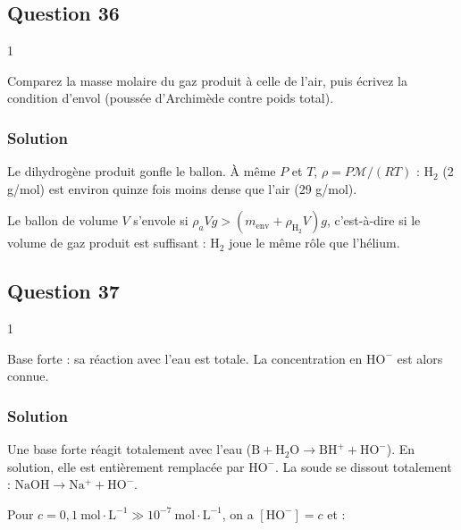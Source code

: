 \documentclass[11pt,a4paper]{article}
\begin{document}
\hypertarget{question-36}{%
\subsection{Question 36}\label{question-36}}

\begin{indication}{1}

Comparez la masse molaire du gaz produit à celle de l'air, puis écrivez la condition d'envol (poussée d'Archimède contre poids total).

\end{indication}

\hypertarget{solution-35}{%
\subsubsection{Solution}\label{solution-35}}

Le dihydrogène produit gonfle le ballon. À même \(P\) et \(T\), \(\rho=P\mathcal M/(RT)\) : \(\mathrm H_2\) (2 g/mol) est environ quinze fois moins dense que l'air (29 g/mol).

Le ballon de volume \(V\) s'envole si \(\rho_aVg>(m_{\text{env}}+\rho_{\mathrm H_2}V)g\), c'est-à-dire si le volume de gaz produit est suffisant : \(\mathrm H_2\) joue le même rôle que l'hélium.

\hypertarget{question-37}{%
\subsection{Question 37}\label{question-37}}

\begin{indication}{1}

Base forte : sa réaction avec l'eau est totale. La concentration en \(\mathrm{HO^-}\) est alors connue.

\end{indication}

\hypertarget{solution-36}{%
\subsubsection{Solution}\label{solution-36}}

Une base forte réagit totalement avec l'eau (\(\mathrm B+\mathrm H_2\mathrm O\to\mathrm{BH^+}+\mathrm{HO^-}\)). En solution, elle est entièrement remplacée par \(\mathrm{HO^-}\). La soude se dissout totalement : \(\mathrm{NaOH}\to\mathrm{Na^+}+\mathrm{HO^-}\).

Pour \(c=0{,}1\ \mathrm{mol\cdot L^{-1}}\gg10^{-7}\ \mathrm{mol\cdot L^{-1}}\), on a \([\mathrm{HO^-}]=c\) et :
\end{document}
